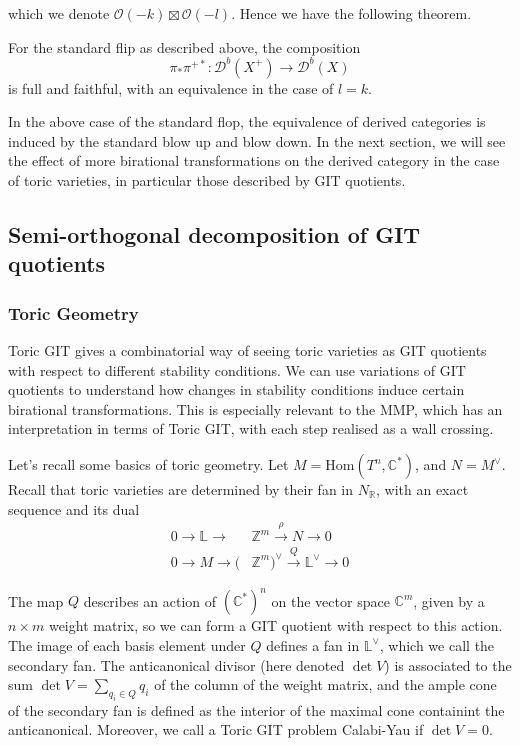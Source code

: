 which we denote $\mathcal{O}(-k) \boxtimes\mathcal{O}(-l)$. Hence we have the following theorem. 

\begin{theorem}{\cite*{Huybrechts}}{}
    For the standard flip as described above, the composition $$
\pi_{*}\pi^{+*}: \mathcal{D}^{b}(X^+)\to \mathcal{D}^{b}(X)
$$ is full and faithful, with an equivalence in the case of $l =k$. 
\end{theorem}

In the above case of the standard flop, the equivalence of derived categories is induced by the standard blow up and blow down. In the next section, we will see the effect of more birational transformations on the derived category in the case of toric varieties, in particular those described by GIT quotients. 

\subsection{Semi-orthogonal decomposition of GIT quotients}

\subsubsection{Toric Geometry}

Toric GIT gives a combinatorial way of seeing toric varieties as GIT quotients with respect to different stability conditions. We can use variations of GIT quotients to understand how changes in stability conditions induce certain birational transformations. This is especially relevant to the MMP, which has an interpretation in terms of Toric GIT, with each step realised as a wall crossing.

Let's recall some basics of toric geometry. Let $M = \mathrm{Hom}(T^{n}, \mathbb{C}^*)$, and $N = M^{\vee}$. Recall that toric varieties are determined by their fan in $N_\mathbb{R}$, with an exact sequence and its dual
\begin{align*}
0 \to \mathbb{L}\to &\mathbb{Z}^{m}\xrightarrow{\rho}N \to 0 \\
0 \to M \to (&\mathbb{Z}^{m})^{\vee} \xrightarrow{Q} \mathbb{L}^{\vee}\to {0}
\end{align*}

The map $Q$ describes an action of $(\mathbb{C}^{*})^n$ on the vector space $\mathbb{C}^m$, given by a $n\times m$ weight matrix, so we can form a GIT quotient with respect to this action. The image of each basis element under $Q$ defines a fan in $\mathbb{L}^{\vee}$, which we call the secondary fan. The anticanonical divisor (here denoted $\det V$) is associated to the sum $\det V = \sum_{q_{i}\in Q}q_i$ of the column of the weight matrix, and the ample cone of the secondary fan is defined as the interior of the maximal cone containint the anticanonical. Moreover, we call a Toric GIT problem Calabi-Yau if $\det V = 0$.  

